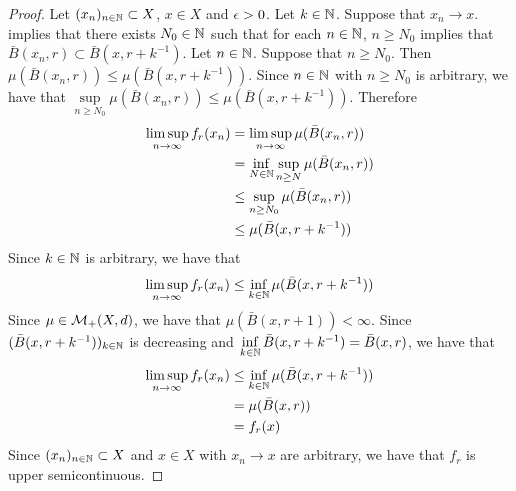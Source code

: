\documentclass{book}
\begin{document}
	\begin{proof}
		Let $(x_n)_{n \in \mathbb{N}} \subset X$, $x \in X$ and $\epsilon > 0$. Let $k \in \mathbb{N}$. Suppose that $x_n \rightarrow x$.  implies that there exists $N_0 \in \mathbb{N}$ such that for each $n \in \mathbb{N}$, $n \geq N_0$ implies that $\bar{B}(x_n, r) \subset \bar{B}(x, r + k^{-1})$. Let $n \in \mathbb{N}$. Suppose that $n \geq N_0$. Then $\mu(\bar{B}(x_n, r)) \leq  \mu(\bar{B}(x, r + k^{-1}))$. Since $n \in \mathbb{N}$ with $n \geq N_0$ is arbitrary, we have that $\sup\limits_{n \geq N_0} \mu(\bar{B}(x_n, r)) \leq \mu(\bar{B}(x, r + k^{-1}))$. Therefore
		\begin{align*}
			\limsup_{n \rightarrow \infty} f_r(x_n)
			& = \limsup_{n \rightarrow \infty}  \mu(\bar{B}(x_n, r)) \\
			& = \inf_{N \in \mathbb{N}} \sup\limits_{n \geq N} \mu(\bar{B}(x_n, r)) \\
			& \leq \sup\limits_{n \geq N_0} \mu(\bar{B}(x_n, r)) \\
			& \leq \mu(\bar{B}(x, r + k^{-1}))
		\end{align*} 
		Since $k \in \mathbb{N}$ is arbitrary, we have that 
		$$\limsup\limits_{n \rightarrow \infty} f_r(x_n) \leq \inf\limits_{k \in \mathbb{N}} \mu(\bar{B}(x, r + k^{-1}))$$ 
		Since $\mu \in \mathcal{M}_+(X, d)$, we have that $\mu(\bar{B}(x, r + 1)) < \infty$. Since $(\bar{B}(x, r + k^{-1}))_{k \in \mathbb{N}}$ is decreasing and $ \inf\limits_{k \in \mathbb{N}} \bar{B}(x, r + k^{-1}) = \bar{B}(x, r)$, we have that 
		\begin{align*}
			\limsup_{n \rightarrow \infty} f_r(x_n)
			& \leq \inf_{k \in \mathbb{N}} \mu(\bar{B}(x, r + k^{-1})) \\
			& = \mu(\bar{B}(x, r) )\\
			& = f_r(x)
		\end{align*}
		Since $(x_n)_{n \in \mathbb{N}} \subset X$ and $x \in X$ with $x_n \rightarrow x$ are arbitrary, we have that $f_r$ is upper semicontinuous. 
	\end{proof}
	
\end{document}
